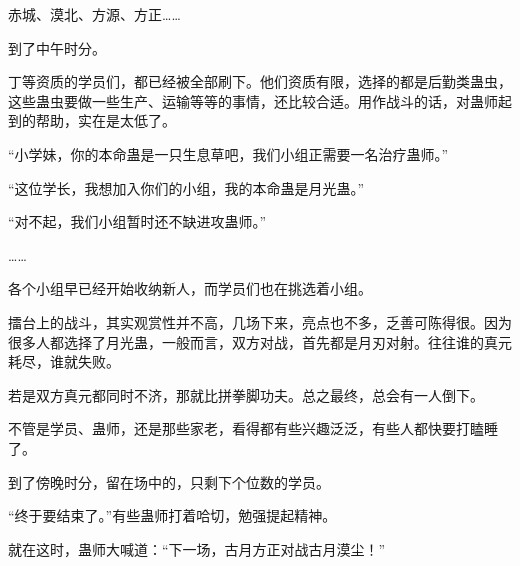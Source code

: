 \begin{this_body}
赤城、漠北、方源、方正……

到了中午时分。

丁等资质的学员们，都已经被全部刷下。他们资质有限，选择的都是后勤类蛊虫，这些蛊虫要做一些生产、运输等等的事情，还比较合适。用作战斗的话，对蛊师起到的帮助，实在是太低了。

“小学妹，你的本命蛊是一只生息草吧，我们小组正需要一名治疗蛊师。”

“这位学长，我想加入你们的小组，我的本命蛊是月光蛊。”

“对不起，我们小组暂时还不缺进攻蛊师。”

……

各个小组早已经开始收纳新人，而学员们也在挑选着小组。

擂台上的战斗，其实观赏性并不高，几场下来，亮点也不多，乏善可陈得很。因为很多人都选择了月光蛊，一般而言，双方对战，首先都是月刃对射。往往谁的真元耗尽，谁就失败。

若是双方真元都同时不济，那就比拼拳脚功夫。总之最终，总会有一人倒下。

不管是学员、蛊师，还是那些家老，看得都有些兴趣泛泛，有些人都快要打瞌睡了。

到了傍晚时分，留在场中的，只剩下个位数的学员。

“终于要结束了。”有些蛊师打着哈切，勉强提起精神。

就在这时，蛊师大喊道：“下一场，古月方正对战古月漠尘！”

\end{this_body}

